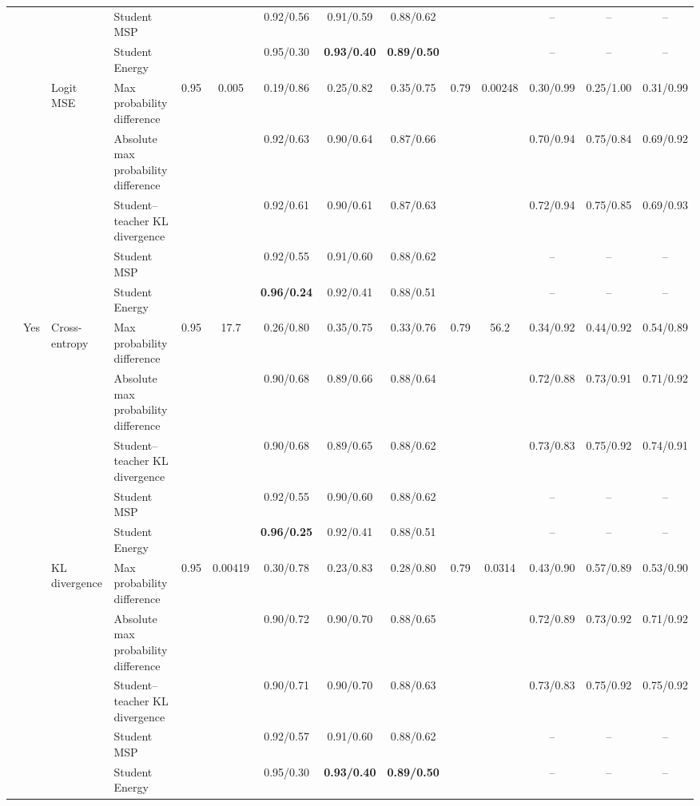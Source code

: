 \documentclass[border=2pt]{standalone}
\begin{document}
\begin{tabular}{llllcccccccccc}
 &  &  & Student MSP &  &  & 0.92/0.56 & 0.91/0.59 & 0.88/0.62 &  &  & -- & -- & -- \\
 &  &  & Student Energy &  &  & 0.95/0.30 & \textbf{0.93/0.40} & \textbf{0.89/0.50} &  &  & -- & -- & -- \\
 &  & Logit MSE & Max probability difference & 0.95 & 0.005 & 0.19/0.86 & 0.25/0.82 & 0.35/0.75 & 0.79 & 0.00248 & 0.30/0.99 & 0.25/1.00 & 0.31/0.99 \\
 &  &  & Absolute max probability difference &  &  & 0.92/0.63 & 0.90/0.64 & 0.87/0.66 &  &  & 0.70/0.94 & 0.75/0.84 & 0.69/0.92 \\
 &  &  & Student--teacher KL divergence &  &  & 0.92/0.61 & 0.90/0.61 & 0.87/0.63 &  &  & 0.72/0.94 & 0.75/0.85 & 0.69/0.93 \\
 &  &  & Student MSP &  &  & 0.92/0.55 & 0.91/0.60 & 0.88/0.62 &  &  & -- & -- & -- \\
 &  &  & Student Energy &  &  & \textbf{0.96/0.24} & 0.92/0.41 & 0.88/0.51 &  &  & -- & -- & -- \\
 & Yes & Cross-entropy & Max probability difference & 0.95 & 17.7 & 0.26/0.80 & 0.35/0.75 & 0.33/0.76 & 0.79 & 56.2 & 0.34/0.92 & 0.44/0.92 & 0.54/0.89 \\
 &  &  & Absolute max probability difference &  &  & 0.90/0.68 & 0.89/0.66 & 0.88/0.64 &  &  & 0.72/0.88 & 0.73/0.91 & 0.71/0.92 \\
 &  &  & Student--teacher KL divergence &  &  & 0.90/0.68 & 0.89/0.65 & 0.88/0.62 &  &  & 0.73/0.83 & 0.75/0.92 & 0.74/0.91 \\
 &  &  & Student MSP &  &  & 0.92/0.55 & 0.90/0.60 & 0.88/0.62 &  &  & -- & -- & -- \\
 &  &  & Student Energy &  &  & \textbf{0.96/0.25} & 0.92/0.41 & 0.88/0.51 &  &  & -- & -- & -- \\
 &  & KL divergence & Max probability difference & 0.95 & 0.00419 & 0.30/0.78 & 0.23/0.83 & 0.28/0.80 & 0.79 & 0.0314 & 0.43/0.90 & 0.57/0.89 & 0.53/0.90 \\
 &  &  & Absolute max probability difference &  &  & 0.90/0.72 & 0.90/0.70 & 0.88/0.65 &  &  & 0.72/0.89 & 0.73/0.92 & 0.71/0.92 \\
 &  &  & Student--teacher KL divergence &  &  & 0.90/0.71 & 0.90/0.70 & 0.88/0.63 &  &  & 0.73/0.83 & 0.75/0.92 & 0.75/0.92 \\
 &  &  & Student MSP &  &  & 0.92/0.57 & 0.91/0.60 & 0.88/0.62 &  &  & -- & -- & -- \\
 &  &  & Student Energy &  &  & 0.95/0.30 & \textbf{0.93/0.40} & \textbf{0.89/0.50} &  &  & -- & -- & -- \\

\end{tabular}
\end{document}
